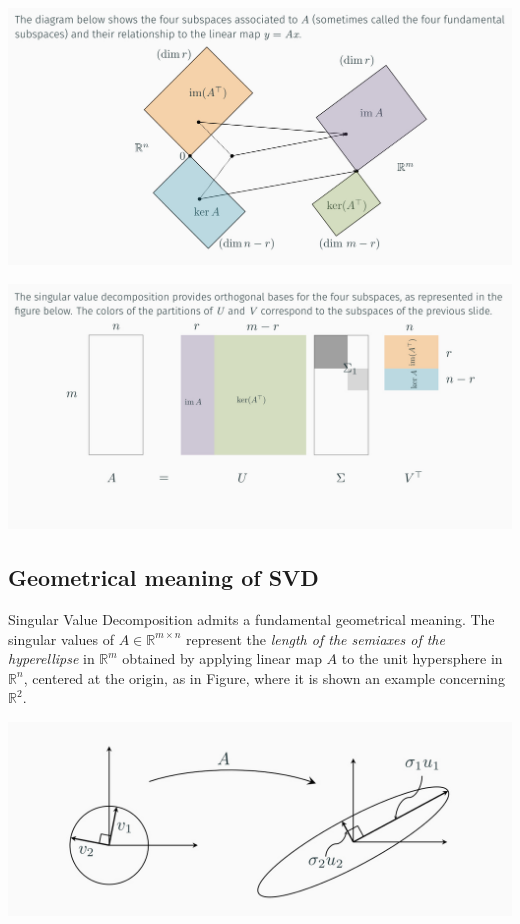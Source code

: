 \documentclass[10pt]{report}
\begin{document}
\begin{center}
\includegraphics[width=.9\linewidth]{./pics/alg/fundamental-subspaces.jpg}
\end{center}
\begin{center}
\includegraphics[width=.9\linewidth]{./pics/alg/fundamental-subspaces2.jpg}
\end{center}

\subsection{Geometrical meaning of SVD}
\label{sec:orgb17e21e}
Singular Value Decomposition admits a fundamental geometrical meaning. The singular values of \(A \in \mathbb{R}^{m \times n}\) represent the \emph{length of the semiaxes of the hyperellipse} in \(\mathbb{R}^m\) obtained by applying linear map \(A\) to the unit hypersphere in \(\mathbb{R}^n\), centered at the origin, as in Figure, where it is shown an example concerning \(\mathbb{R}^2\).

\begin{center}
\includegraphics[width=.9\linewidth]{./pics/alg/svd-geom.jpg}
\end{center}
\end{document}
